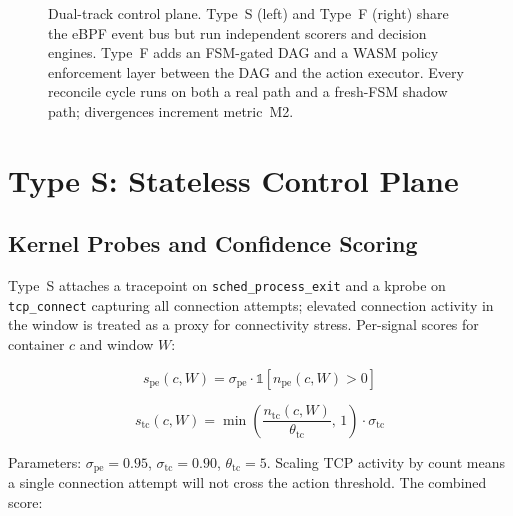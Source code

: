 \documentclass[conference]{IEEEtran}
\begin{document}
\begin{figure}[!t]
\vspace{2pt}
\caption{Dual-track control plane. Type~S (left) and Type~F (right) share the eBPF event bus but run independent scorers and decision engines. Type~F adds an FSM-gated DAG and a WASM policy enforcement layer between the DAG and the action executor. Every reconcile cycle runs on both a real path and a fresh-FSM shadow path; divergences increment metric~M2.}
\label{fig:arch}
\end{figure}

\section{Type S: Stateless Control Plane}
\label{sec:types}

\subsection{Kernel Probes and Confidence Scoring}

Type~S attaches a tracepoint on \texttt{sched\_process\_exit} and a kprobe on \texttt{tcp\_connect} capturing all connection attempts; elevated connection activity in the window is treated as a proxy for connectivity stress. Per-signal scores for container $c$ and window $W$:

\begin{equation}
s_{\mathrm{pe}}(c, W) = \sigma_{\mathrm{pe}} \cdot \mathbb{1}\!\left[n_{\mathrm{pe}}(c, W) > 0\right]
\label{eq:spe}
\end{equation}

\begin{equation}
s_{\mathrm{tc}}(c, W) = \min\!\left(\frac{n_{\mathrm{tc}}(c, W)}{\theta_{\mathrm{tc}}},\, 1\right) \cdot \sigma_{\mathrm{tc}}
\label{eq:stc}
\end{equation}

Parameters: $\sigma_{\mathrm{pe}} = 0.95$, $\sigma_{\mathrm{tc}} = 0.90$, $\theta_{\mathrm{tc}} = 5$. Scaling TCP activity by count means a single connection attempt will not cross the action threshold. The combined score:
\end{document}
